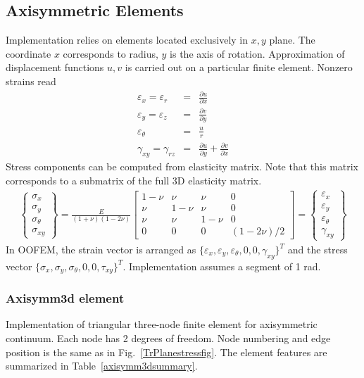 \documentclass[a4paper]{article}
\begin{document}
\clearpage
\subsection{Axisymmetric Elements}
Implementation relies on elements located exclusively in $x,y$ plane. The coordinate $x$ corresponds to radius, $y$ is the axis of rotation. Approximation of displacement functions $u,v$ is carried out on a particular finite element. Nonzero strains read
\begin{eqnarray}
\varepsilon_{x}=\varepsilon_{r}&=&\frac{\partial u}{\partial x}\\
\varepsilon_{y}=\varepsilon_{z}&=&\frac{\partial v}{\partial y}\\
\varepsilon_{\theta}&=&\frac{u}{r}\\
\gamma_{xy}=\gamma_{rz}&=&\frac{\partial u}{\partial y} + \frac{\partial v}{\partial x}
\end{eqnarray}
Stress components can be computed from elasticity matrix. Note that this matrix corresponds to a submatrix of the full 3D elasticity matrix.
\begin{eqnarray}
\left\{\begin{array}{c} \sigma_x \\ \sigma_y \\ \sigma_\theta \\ \sigma_{xy} \end{array} \right\} = 
\frac{E}{(1+\nu)(1-2\nu)}\left[ \begin{array}{cccc} 1-\nu & \nu & \nu & 0 \\ \nu & 1-\nu & \nu & 0 \\ \nu & \nu & 1-\nu & 0 \\ 0 & 0 & 0 & (1-2\nu)/2 \end{array} \right] = 
\left\{\begin{array}{c} \varepsilon_x \\ \varepsilon_y \\ \varepsilon_\theta \\ \gamma_{xy} \end{array} \right\} 
\end{eqnarray}
In OOFEM, the strain vector is arranged as $\{\varepsilon_{x}, \varepsilon_{y}, \varepsilon_{\theta}, 0, 0, \gamma_{xy}\}^T$ and the stress vector $\{\sigma_{x}, \sigma_{y}, \sigma_{\theta}, 0, 0, \tau_{xy}\}^T$. Implementation assumes a segment of 1 rad.

\subsubsection{Axisymm3d element}
Implementation of triangular three-node finite element 
for axisymmetric continuum. Each node has 2 degrees of freedom. 
Node numbering and edge position is the same as in Fig.~\ref{TrPlanestressfig}. 
The element features are summarized in Table~\ref{axisymm3dsummary}. 
\end{document}
